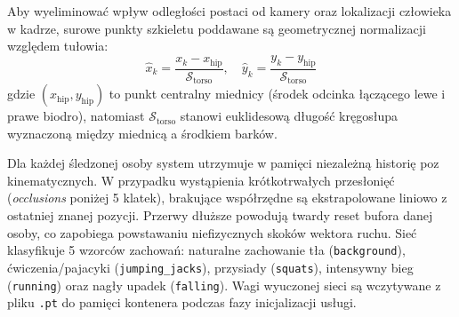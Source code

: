 \begin{figure-}
    \centering
    \caption{Architektura klasyfikatora szeregów czasowych LSTM.}\label{fig:architektura_lstm}
\end{figure-}

Aby wyeliminować wpływ odległości postaci od kamery oraz lokalizacji człowieka w kadrze, surowe punkty szkieletu poddawane są geometrycznej normalizacji względem tułowia:
\begin{equation}
    \hat{x}_k = \frac{x_k - x_{\text{hip}}}{\mathcal{S}_{\text{torso}}}, \quad \hat{y}_k = \frac{y_k - y_{\text{hip}}}{\mathcal{S}_{\text{torso}}}
\end{equation}
gdzie $(x_{\text{hip}}, y_{\text{hip}})$ to punkt centralny miednicy (środek odcinka łączącego lewe i prawe biodro), natomiast $\mathcal{S}_{\text{torso}}$ stanowi euklidesową długość kręgosłupa wyznaczoną między miednicą a środkiem barków. 

Dla każdej śledzonej osoby system utrzymuje w pamięci niezależną historię poz kinematycznych. W przypadku wystąpienia krótkotrwałych przesłonięć (\textit{occlusions} poniżej 5 klatek), brakujące współrzędne są ekstrapolowane liniowo z ostatniej znanej pozycji. Przerwy dłuższe powodują twardy reset bufora danej osoby, co zapobiega powstawaniu niefizycznych skoków wektora ruchu. Sieć klasyfikuje 5 wzorców zachowań: naturalne zachowanie tła (\texttt{background}), ćwiczenia/pajacyki (\texttt{jumping\_jacks}), przysiady (\texttt{squats}), intensywny bieg (\texttt{running}) oraz nagły upadek (\texttt{falling}). Wagi wyuczonej sieci są wczytywane z pliku \texttt{.pt} do pamięci kontenera podczas fazy inicjalizacji usługi.

